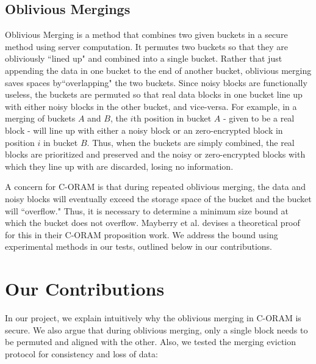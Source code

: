 \documentclass[12pt, oneside]{article}   	%
\begin{document}
\subsection{Oblivious Mergings}
Oblivious Merging is a method that combines two given buckets in a secure method using server computation. It permutes two buckets so that they are obliviously ``lined up" and combined into a single bucket. Rather that just appending the data in one bucket to the end of another bucket, oblivious merging saves spaces by``overlapping" the two buckets. Since noisy blocks are functionally useless, the buckets are permuted so that real data blocks in one bucket line up with either noisy blocks in the other bucket, and vice-versa. For example, in a merging of buckets $A$ and $B$, the $i$th position in bucket $A$ - given to be a real block - will line up with either a noisy block or an zero-encrypted block in position $i$ in bucket $B$. Thus, when the buckets are simply combined, the real blocks are prioritized and preserved and the noisy or zero-encrypted blocks with which they line up with are discarded, losing no information. 


A concern for C-ORAM is that during repeated oblivious merging, the data and noisy blocks will eventually exceed the storage space of the bucket and the bucket will ``overflow." Thus, it is necessary to determine a minimum size bound at which the bucket does not overflow. Mayberry et al. devises a theoretical proof for this in their C-ORAM proposition work. We address the bound using experimental methods in our tests, outlined below in our contributions.




\section{Our Contributions}

In our project, we explain intuitively why the oblivious merging in C-ORAM is secure. We also argue that during oblivious merging, only a single block needs to be permuted and aligned with the other. Also, we tested the merging eviction protocol for consistency and loss of data:
\end{document}
